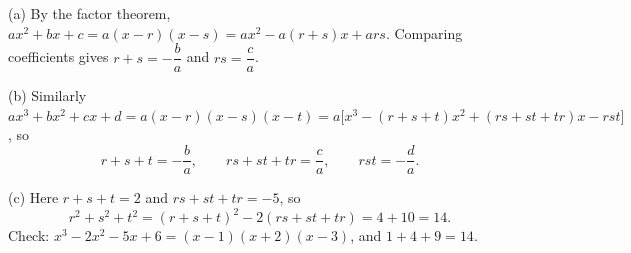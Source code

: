 (a) By the factor theorem, $ax^2+bx+c=a(x-r)(x-s)=ax^2-a(r+s)x+ars$. Comparing coefficients gives $r+s=-\dfrac ba$ and $rs=\dfrac ca$.

(b) Similarly $ax^3+bx^2+cx+d=a(x-r)(x-s)(x-t)=a\bigl[x^3-(r+s+t)x^2+(rs+st+tr)x-rst\bigr]$, so
\[r+s+t=-\dfrac ba,\qquad rs+st+tr=\dfrac ca,\qquad rst=-\dfrac da.\]

(c) Here $r+s+t=2$ and $rs+st+tr=-5$, so
\[r^2+s^2+t^2=(r+s+t)^2-2(rs+st+tr)=4+10=\boxed{14}.\]
Check: $x^3-2x^2-5x+6=(x-1)(x+2)(x-3)$, and $1+4+9=14$.
